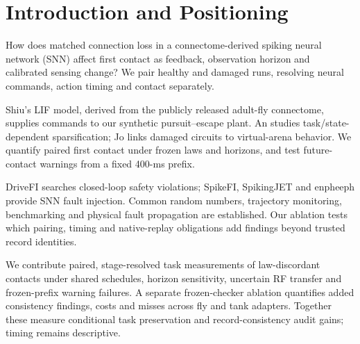 \section{Introduction and Positioning}
How does matched connection loss in a connectome-derived spiking neural network (SNN) affect first contact as feedback, observation horizon and calibrated sensing change? We pair healthy and damaged runs, resolving neural commands, action timing and contact separately.

Shiu's LIF model\cite{shiu2024drosophila}, derived from the publicly released adult-fly connectome\cite{dorkenwald2024neuronal}, supplies commands to our synthetic pursuit--escape plant. An\cite{an2026sparse} studies task/state-dependent sparsification; Jo\cite{jo2026simulating} links damaged circuits to virtual-arena behavior. We quantify paired first contact under frozen laws and horizons, and test future-contact warnings from a fixed 400-ms prefix.

DriveFI searches closed-loop safety violations\cite{jha2019drivefi}; SpikeFI, SpikingJET and enpheeph provide SNN fault injection\cite{spyrou2024spikefi,gogebakan2024spikingjet,colucci2022enpheeph}. Common random numbers\cite{glasserman1992crn}, trajectory monitoring\cite{donze2010breach}, benchmarking\cite{yik2023neurobench,dangelo2026embodied} and physical fault propagation\cite{chessa2026crosslayer} are established. Our ablation tests which pairing, timing and native-replay obligations add findings beyond trusted record identities.

We contribute paired, stage-resolved task measurements of law-discordant contacts under shared schedules, horizon sensitivity, uncertain RF transfer and frozen-prefix warning failures. A separate frozen-checker ablation quantifies added consistency findings, costs and misses across fly and tank adapters. Together these measure conditional task preservation and record-consistency audit gains; timing remains descriptive.
